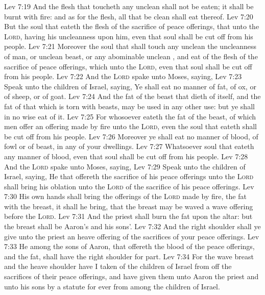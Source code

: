 \vs Lev 7:19 And the flesh that toucheth any unclean  shall not be eaten; it shall be burnt with fire: and as for the flesh, all that be clean shall eat thereof.
\vs Lev 7:20 But the soul that eateth  the flesh of the sacrifice of peace offerings, that  unto the \textsc{Lord}, having his uncleanness upon him, even that soul shall be cut off from his people.
\vs Lev 7:21 Moreover the soul that shall touch any unclean  the uncleanness of man, or  unclean beast, or any abominable unclean , and eat of the flesh of the sacrifice of peace offerings, which  unto the \textsc{Lord}, even that soul shall be cut off from his people.
\vs Lev 7:22 And the \textsc{Lord} spake unto Moses, saying,
\vs Lev 7:23 Speak unto the children of Israel, saying, Ye shall eat no manner of fat, of ox, or of sheep, or of goat.
\vs Lev 7:24 And the fat of the beast that dieth of itself, and the fat of that which is torn with beasts, may be used in any other use: but ye shall in no wise eat of it.
\vs Lev 7:25 For whosoever eateth the fat of the beast, of which men offer an offering made by fire unto the \textsc{Lord}, even the soul that eateth  shall be cut off from his people.
\vs Lev 7:26 Moreover ye shall eat no manner of blood,  of fowl or of beast, in any of your dwellings.
\vs Lev 7:27 Whatsoever soul  that eateth any manner of blood, even that soul shall be cut off from his people.
\vs Lev 7:28 And the \textsc{Lord} spake unto Moses, saying,
\vs Lev 7:29 Speak unto the children of Israel, saying, He that offereth the sacrifice of his peace offerings unto the \textsc{Lord} shall bring his oblation unto the \textsc{Lord} of the sacrifice of his peace offerings.
\vs Lev 7:30 His own hands shall bring the offerings of the \textsc{Lord} made by fire, the fat with the breast, it shall he bring, that the breast may be waved  a wave offering before the \textsc{Lord}.
\vs Lev 7:31 And the priest shall burn the fat upon the altar: but the breast shall be Aaron's and his sons'.
\vs Lev 7:32 And the right shoulder shall ye give unto the priest  an heave offering of the sacrifices of your peace offerings.
\vs Lev 7:33 He among the sons of Aaron, that offereth the blood of the peace offerings, and the fat, shall have the right shoulder for  part.
\vs Lev 7:34 For the wave breast and the heave shoulder have I taken of the children of Israel from off the sacrifices of their peace offerings, and have given them unto Aaron the priest and unto his sons by a statute for ever from among the children of Israel.

